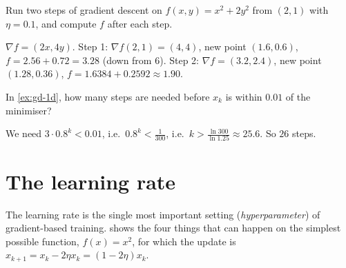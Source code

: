 \begin{exercise}
Run two steps of gradient descent on $f(x, y) = x^2 + 2y^2$ from $(2, 1)$ with
$\eta = 0.1$, and compute $f$ after each step.
\end{exercise}
\begin{solution}
$\nabla f = (2x, 4y)$. Step 1: $\nabla f(2,1) = (4, 4)$, new point $(1.6, 0.6)$,
$f = 2.56 + 0.72 = 3.28$ (down from $6$). Step 2: $\nabla f = (3.2, 2.4)$, new
point $(1.28, 0.36)$, $f = 1.6384 + 0.2592 \approx 1.90$.
\end{solution}

\begin{exercise}
In \cref{ex:gd-1d}, how many steps are needed before $x_k$ is within $0.01$ of
the minimiser?
\end{exercise}
\begin{solution}
We need $3\cdot0.8^k < 0.01$, i.e.\ $0.8^k < \tfrac{1}{300}$, i.e.\
$k > \tfrac{\ln300}{\ln1.25} \approx 25.6$. So $26$ steps.
\end{solution}

\section{The learning rate}\label{sec:learning-rate}

The learning rate is the single most important setting (\emph{hyperparameter})
of gradient-based training. \Cref{fig:learning-rates} shows the four things that
can happen on the simplest possible function, $f(x) = x^2$, for which the update
is $x_{k+1} = x_k - 2\eta x_k = (1 - 2\eta)x_k$.


